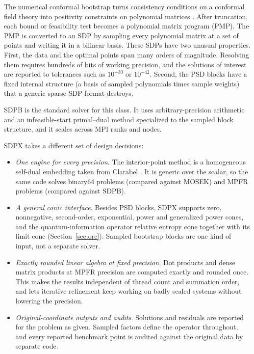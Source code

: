 \documentclass[11pt]{article}
\begin{document}
The numerical conformal bootstrap turns consistency conditions on a conformal
field theory into positivity constraints on polynomial matrices
\cite{Rattazzi2008,PolandRychkovVichi2019}. After truncation, each bound or
feasibility test becomes a polynomial matrix program (PMP). The PMP is
converted to an SDP by sampling every polynomial matrix at a set of points and
writing it in a bilinear basis. These SDPs have two unusual properties. First,
the data and the optimal points span many orders of magnitude. Resolving them
requires hundreds of bits of working precision, and the solutions of interest
are reported to tolerances such as $10^{-30}$ or $10^{-42}$. Second, the PSD
blocks have a fixed internal structure (a basis of sampled polynomials times
sample weights) that a generic sparse SDP format destroys.

SDPB \cite{SimmonsDuffin2015,LandrySimmonsDuffin2019} is the standard solver
for this class. It uses arbitrary-precision arithmetic and an
infeasible-start primal--dual method specialized to the sampled block
structure, and it scales across MPI ranks and nodes.

SDPX takes a different set of design decisions:
\begin{itemize}
  \item \emph{One engine for every precision.} The interior-point method is
    a homogeneous self-dual embedding \cite{YeToddMizuno1994} taken from
    Clarabel \cite{GoulartChen2024}. It is generic over the scalar, so the
    same code solves binary64 problems (compared against MOSEK) and MPFR
    problems (compared against SDPB).
  \item \emph{A general conic interface.} Besides PSD blocks, SDPX supports
    zero, nonnegative, second-order, exponential, power and generalized power
    cones, and the quantum-information operator relative entropy cone
    together with its limit cone (Section~\ref{sec:ore}). Sampled bootstrap
    blocks are one kind of input, not a separate solver.
  \item \emph{Exactly rounded linear algebra at fixed precision.} Dot products
    and dense matrix products at MPFR precision are computed exactly and
    rounded once. This makes the results independent of thread count and
    summation order, and lets iterative refinement keep working on badly
    scaled systems without lowering the precision.
  \item \emph{Original-coordinate outputs and audits.} Solutions and residuals
    are reported for the problem as given. Sampled factors define the
    operator throughout, and every reported benchmark point is audited
    against the original data by separate code.
\end{itemize}
\end{document}
